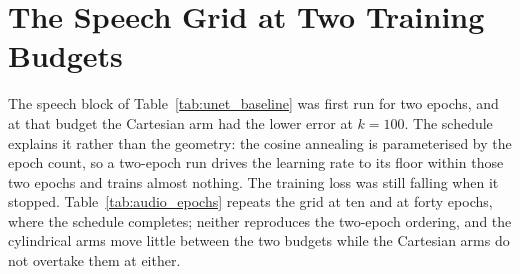 \section{The Speech Grid at Two Training Budgets}
\label{sec:app_audio_epochs}
The speech block of Table~\ref{tab:unet_baseline} was first run for two epochs, and at that
budget the Cartesian arm had the lower error at $k=100$. The schedule explains it rather than
the geometry: the cosine annealing is parameterised by the epoch count, so a two-epoch run
drives the learning rate to its floor within those two epochs and trains almost nothing. The
training loss was still falling when it stopped. Table~\ref{tab:audio_epochs} repeats the grid
at ten and at forty epochs, where the schedule completes; neither reproduces the two-epoch
ordering, and the cylindrical arms move little between the two budgets while the Cartesian
arms do not overtake them at either.

